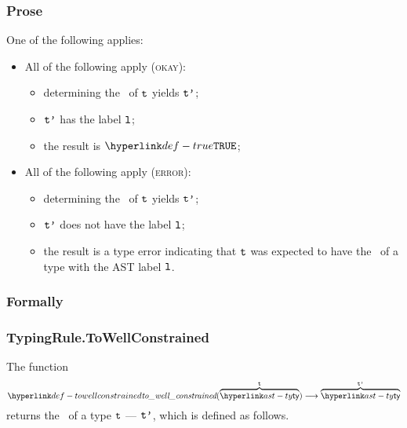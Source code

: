 \subsubsection{Prose}
One of the following applies:
\begin{itemize}
  \item All of the following apply (\textsc{okay}):
  \begin{itemize}
    \item determining the \structure\ of $\texttt{t}$ yields $\texttt{t'}$\ProseOrTypeError;
    \item $\texttt{t'}$ has the label $\texttt{l}$;
    \item the result is $\True$;
  \end{itemize}

  \item All of the following apply (\textsc{error}):
  \begin{itemize}
    \item determining the \structure\ of $\texttt{t}$ yields $\texttt{t'}$\ProseOrTypeError;
    \item $\texttt{t'}$ does not have the label $\texttt{l}$;
    \item the result is a type error indicating that $\texttt{t}$ was expected to have the \structure\ of a type with the AST label $\texttt{l}$.
  \end{itemize}
\end{itemize}

\subsubsection{Formally}

\subsubsection{TypingRule.ToWellConstrained}
\hypertarget{def-towellconstrained}{}
The function
\[
  \towellconstrained(\overname{\ty}{\vt}) \aslto \overname{\ty}{\vtp}
\]
returns the \wellconstrainedversion\ of a type $\texttt{t}$ --- $\texttt{t'}$, which is defined as follows.

